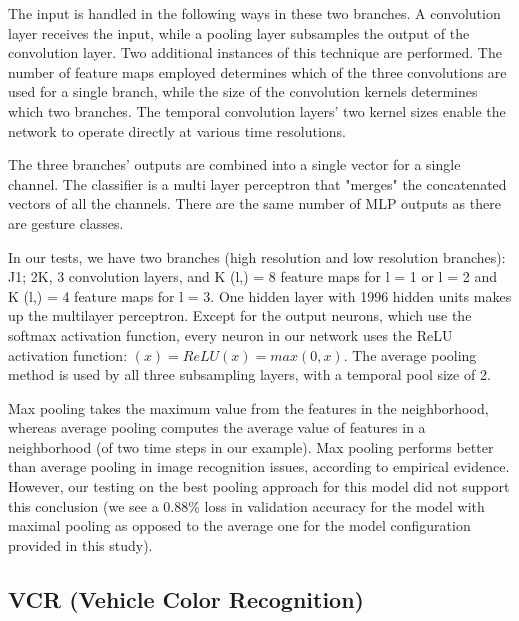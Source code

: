\documentclass[letterpaper, 10 pt, conference]{ieeeconf}  %
\begin{document}
The input is handled in the following ways in these two branches. A convolution layer receives the input, while a pooling layer subsamples the output of the convolution layer. Two additional instances of this technique are performed. The number of feature maps employed determines which of the three convolutions are used for a single branch, while the size of the convolution kernels determines which two branches. The temporal convolution layers' two kernel sizes enable the network to operate directly at various time resolutions.\par

The three branches' outputs are combined into a single vector for a single channel. The classifier is a multi layer perceptron that "merges" the concatenated vectors of all the channels. There are the same number of MLP outputs as there are gesture classes. \par

In our tests, we have two branches (high resolution and low resolution branches): J1; 2K, 3 convolution layers, and K (l,) = 8 feature maps for l = 1 or l = 2 and K (l,) = 4 feature maps for l = 3. One hidden layer with 1996 hidden units makes up the multilayer perceptron. Except for the output neurons, which use the softmax activation function, every neuron in our network uses the ReLU activation function: $(x) = ReLU(x) = max(0,x)$. The average pooling method is used by all three subsampling layers, with a temporal pool size of 2. \par

Max pooling takes the maximum value from the features in the neighborhood, whereas average pooling computes the average value of features in a neighborhood (of two time steps in our example). Max pooling performs better than average pooling in image recognition issues, according to empirical evidence. However, our testing on the best pooling approach for this model did not support this conclusion (we see a 0.88\% loss in validation accuracy for the model with maximal pooling as opposed to the average one for the model configuration provided in this study). \par

\subsection*{\bf VCR (Vehicle Color Recognition)}
\end{document}
